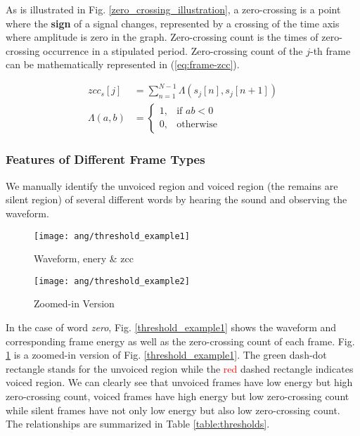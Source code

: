 As is illustrated in Fig. \ref{zero_crossing_illustration}, a zero-crossing is a point where the \textbf{sign} of a signal changes, represented by a crossing of the time axis where amplitude is zero in the graph. Zero-crossing count is the times of zero-crossing occurrence in a stipulated period. Zero-crossing count of the $j$-th frame can be mathematically represented in (\ref{eq:frame-zcc}).

\begin{align}
\label{eq:frame-zcc}
zcc_s[j] &= \sum_{n=1}^{N-1} \Lambda ( s_j[n], s_j[n+1] )\\
\Lambda ( a, b ) &=
\begin{cases}
1, &\text{if } ab < 0\\
0, &\text{otherwise}
\end{cases}
\end{align}


\subsubsection{Features of Different Frame Types}

We manually identify the unvoiced region and voiced region (the remains are silent region) of several different words by hearing the sound and observing the waveform.

\begin{figure}[H]
\begin{minipage}[t]{0.5\linewidth}
\centering
\texttt{[image: ang/threshold\_example1]}
\caption{Waveform, enery \& zcc}
\label{threshold_example1}
\end{minipage}
\begin{minipage}[t]{0.5\linewidth}
\centering
\texttt{[image: ang/threshold\_example2]}
\caption{Zoomed-in Version}
\label{threshold_example2}
\end{minipage}
\end{figure}

In the case of word \textit{zero}, Fig. \ref{threshold_example1} shows the waveform and corresponding frame energy as well as the zero-crossing count of each frame. Fig. \ref{threshold_example2} is a zoomed-in version of Fig. \ref{threshold_example1}. The \textcolor{green_html}{green} dash-dot rectangle stands for the unvoiced region while the \textcolor{red}{red} dashed rectangle indicates voiced region. We can clearly see that unvoiced frames have low energy but high zero-crossing count, voiced frames have high energy but low zero-crossing count while silent frames have not only low energy but also low zero-crossing count. The relationships are summarized in Table \ref{table:thresholds}.

